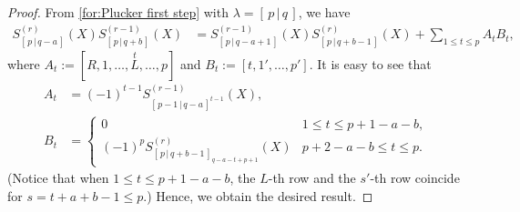 \documentclass[12pt]{amsart}%
\theoremstyle{definition}
\begin{document}
\begin{proof}
From \eqref{for:Plucker first step}
with $\lambda=[\,p\,|\,q\,]$,
we have 
\begin{align*}
 S_{[\,p\,|\,q-a\,]}^{(r)}(X)
 S_{[\,p\,|\,q+b\,]}^{(r-1)}(X)
&=S_{[\,p\,|\,q-a+1\,]}^{(r-1)}(X)
S_{[\,p\,|\,q+b-1\,]}^{(r)}(X)
+\sum_{1\le t\le p}A_tB_t,
\end{align*}
where 
$A_t:=[R,1,\ldots,\overset{t}{L},\ldots,p]$ and 
$B_t:=[t,1',\ldots,p']$.
It is easy to see that 
\begin{align*}
A_t
&=(-1)^{t-1}S^{(r-1)}_{[\,p-1\,|\,q-a\,]^{t-1}}(X),\\
B_t
&=
\begin{cases}
0 & 1\le t\le p+1-a-b,\\
(-1)^{p}S^{(r)}_{[\,p\,|\,q+b-1\,]_{q-a-t+p+1}}(X) & p+2-a-b\le t\le p. 
\end{cases}
\end{align*}
(Notice that when $1\le t\le p+1-a-b$, 
the $L$-th row and the $s'$-th row coincide for $s=t+a+b-1\le p$.)
Hence, we obtain the desired result.


\end{proof}
\end{document}
